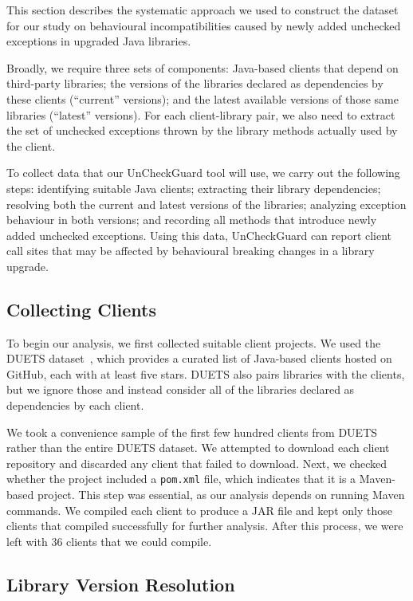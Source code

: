 This section describes the systematic approach we used to construct the dataset for our study on behavioural incompatibilities caused by newly added unchecked exceptions in upgraded Java libraries. 

Broadly, we require three sets of components: Java-based clients that depend on third-party libraries; the versions of the libraries declared as dependencies by these clients (``current'' versions); and the latest available versions of those same libraries (``latest'' versions). For each client-library pair, we also need to extract the set of unchecked exceptions thrown by the library methods actually used by the client.

To collect data that our UnCheckGuard tool will use, we carry out the following steps: identifying suitable Java clients; extracting their library dependencies; resolving both the current and latest versions of the libraries; analyzing exception behaviour in both versions; and recording all methods that introduce newly added unchecked exceptions. Using this data, UnCheckGuard can report client call sites that may be affected by behavioural breaking changes in a library upgrade.

\subsection{Collecting Clients}

To begin our analysis, we first collected suitable client projects. We used the DUETS dataset~\cite{durieux21:_duets}, which provides a curated list of Java-based clients hosted on GitHub, each with at least five stars. DUETS also pairs libraries with the clients, but we ignore those and instead consider all of the libraries declared as dependencies by each client.

We took a convenience sample of the first few hundred clients from DUETS rather than the entire DUETS dataset. We attempted to download each client repository and discarded any client that failed to download.
Next, we checked whether the project included a \texttt{pom.xml} file, which indicates that it is a Maven-based project. This step was essential, as our analysis depends on running Maven commands. We compiled each client to produce a JAR file and kept only those clients that compiled successfully for further analysis. After this process, we were left with 36 clients that we could compile.

\subsection{Library Version Resolution}

